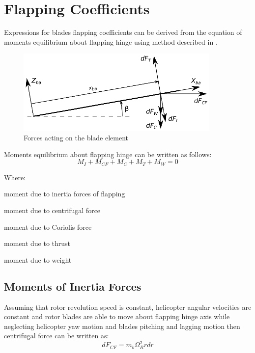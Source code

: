 \section{Flapping Coefficients}

Expressions for blades flapping coefficients can be derived from the equation of moments equilibrium about flapping hinge using method described in \cite{NASA-TT-F-494}.

\begin{figure}
  \centering
  \includegraphics[width=100mm]{eps/blade_element_moments.eps}
  \caption{Forces acting on the blade element}
\end{figure}

\begin{minipage}{\textwidth}
  Moments equilibrium about flapping hinge can be written as follows: \cite{GessowMyers1985}
  \begin{equation}
    \label{eq-aero-blade-moments-equilibrium}
    M_I + M_{CF} + M_C + M_T + M_W = 0
  \end{equation}

  Where:
  \begin{description}[align=right,labelwidth=1.5cm]
    \item [$M_I$]    [N$\cdot$m] moment due to inertia forces of flapping
    \item [$M_{CF}$] [N$\cdot$m] moment due to centrifugal force
    \item [$M_C$]    [N$\cdot$m] moment due to Coriolis force
    \item [$M_T$]    [N$\cdot$m] moment due to thrust
    \item [$M_W$]    [N$\cdot$m] moment due to weight
  \end{description}
\end{minipage}

\subsection{Moments of Inertia Forces}

Assuming that rotor revolution speed is constant, helicopter angular velocities are constant and rotor blades are able to move about flapping hinge axis while neglecting helicopter yaw motion and blades pitching and lagging motion then centrifugal force can be written as:
\begin{equation}
  dF_{CF} = m_b \Omega_R^2 r dr
\end{equation}

